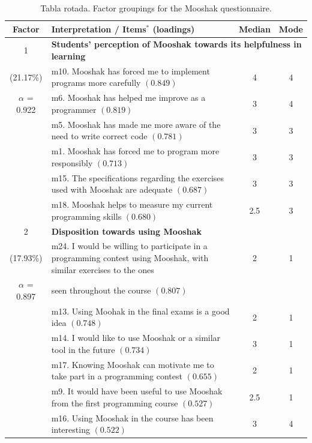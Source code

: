 \begin{table}
  \centering
  \caption{Tabla rotada. Factor groupings for the Mooshak questionnaire.}\label{tab:factor_analysis}

\renewcommand{\arraystretch}{1.1}
\begin{scriptsize}
 \begin{tabular}{clcc}
   \hline
   Factor & \textbf{Interpretation} / Items$^{*}$ (loadings)  & Median & Mode \\
   \hline
   \hline
    1 & \multicolumn{3}{l}{\textbf{Students' perception of Mooshak towards its helpfulness in learning} } \\
   \hline
    (21.17\%) & m10. Mooshak has forced me to implement programs more carefully $(0.849)$ & 4 & 4 \\
    $\alpha$ = 0.922 & m6.  Mooshak has helped me improve as a programmer $(0.819)$ & 3 & 4 \\
     & m5.  Mooshak has made me more aware of the need to write correct code $(0.781)$ & 3 & 3\\
     & m1. Mooshak has forced me to program more responsibly $(0.713)$ & 3 & 3 \\
     & m15. The specifications regarding the exercises used with Mooshak are adequate $(0.687)$ & 3 & 3 \\
     & m18. Mooshak helps to measure my current programming skills $(0.680)$ & 2.5 & 3 \\
   \hline
    2 & \multicolumn{3}{l}{\textbf{Disposition towards using Mooshak} } \\
   \hline
    (17.93\%) & m24. I would be willing to participate in a programming contest using Mooshak, with similar exercises to the ones & 2 & 1 \\
    $\alpha$ = 0.897 & seen throughout the course $(0.807)$ & & \\
    & m13. Using Moohak in the final exams is a good idea $(0.748)$ & 2 & 1 \\
    & m14. I would like to use Mooshak or a similar tool in the future $(0.734)$ & 3 & 1 \\
    & m17. Knowing Mooshak can motivate me to take part in a programming contest $(0.655)$ & 2 & 1\\
    & m9. It would have been useful to use Mooshak from the first programming course $(0.527)$ & 2.5 & 1\\
     & m16. Using Mooshak in the course has been interesting $(0.522)$ & 3 & 4 \\

\end{tabular}
\end{scriptsize}
\end{table}
